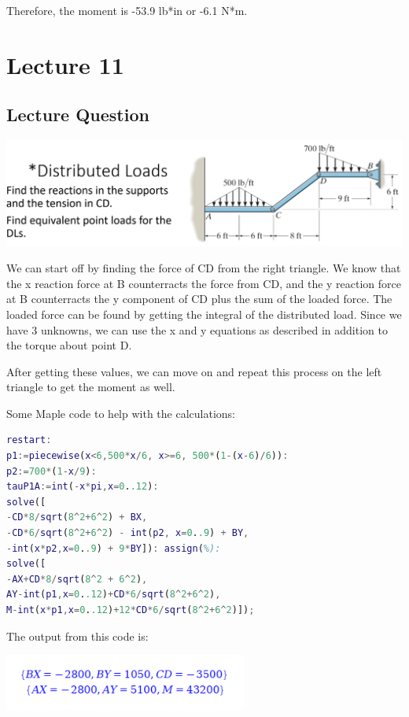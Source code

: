 \documentclass{article}[14pt, letterpaper, Times New Roman]
\begin{document}
Therefore, the moment is -53.9 lb*in or -6.1 N*m.

\section{Lecture 11}

\subsection{Lecture Question}

\includegraphics[width=15cm]{l11-lq.png}

We can start off by finding the force of CD from the right triangle.
We know that the x reaction force at B counterracts the force from CD, and the y reaction force at B counterracts the y component of CD plus the sum of the loaded force.
The loaded force can be found by getting the integral of the distributed load.
Since we have 3 unknowns, we can use the x and y equations as described in addition to the torque about point D.

After getting these values, we can move on and repeat this process on the left triangle to get the moment as well.

Some Maple code to help with the calculations:

\begin{lstlisting}[language=matlab]
restart:
p1:=piecewise(x<6,500*x/6, x>=6, 500*(1-(x-6)/6)):
p2:=700*(1-x/9):
tauP1A:=int(-x*pi,x=0..12):
solve([
-CD*8/sqrt(8^2+6^2) + BX,
-CD*6/sqrt(8^2+6^2) - int(p2, x=0..9) + BY,
-int(x*p2,x=0..9) + 9*BY]): assign(%):
solve([
-AX+CD*8/sqrt(8^2 + 6^2),
AY-int(p1,x=0..12)+CD*6/sqrt(8^2+6^2),
M-int(x*p1,x=0..12)+12*CD*6/sqrt(8^2+6^2)]);
\end{lstlisting}

The output from this code is:

\includegraphics[width=8cm]{l11-lq-o.png}
\end{document}
